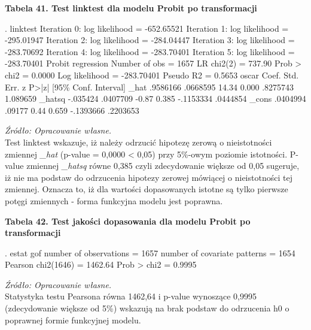 \vspace{0.5cm}
\textbf{Tabela 41. Test linktest dla modelu Probit po transformacji}
\begin{stlog}
. linktest
{\smallskip}
Iteration 0:   log likelihood = -652.65521  
Iteration 1:   log likelihood = -295.01947  
Iteration 2:   log likelihood = -284.04447  
Iteration 3:   log likelihood = -283.70692  
Iteration 4:   log likelihood = -283.70401  
Iteration 5:   log likelihood = -283.70401  
{\smallskip}
Probit regression                                 Number of obs   =       1657
                                                  LR chi2(2)      =     737.90
                                                  Prob > chi2     =     0.0000
Log likelihood = -283.70401                       Pseudo R2       =     0.5653
{\smallskip}
       oscar {\VBAR}      Coef.   Std. Err.      z    P>|z|     [95\% Conf. Interval]
        _hat {\VBAR}   .9586166   .0668595    14.34   0.000     .8275743    1.089659
      _hatsq {\VBAR}   -.035424   .0407709    -0.87   0.385    -.1153334    .0444854
       _cons {\VBAR}   .0404994     .09177     0.44   0.659    -.1393666    .2203653
\end{stlog}
\textit{\footnotesize{Źródło: Opracowanie własne.}} \\

Test linktest wskazuje, iż należy odrzucić hipotezę zerową o nieistotności zmiennej \textit{_hat} (p-value = 0,0000 < 0,05) przy 5\%-owym poziomie istotności.
P-value zmiennej \textit{_hatsq} równe 0,385 czyli zdecydowanie większe od 0,05 sugeruje, iż nie ma podstaw do odrzucenia hipotezy zerowej mówiącej o nieistotności tej zmiennej. Oznacza to, iż dla wartości dopasowanych istotne są tylko pierwsze potęgi zmiennych - forma funkcyjna modelu jest poprawna.

\vspace{0.5cm}
\textbf{Tabela 42. Test jakości dopasowania dla modelu Probit po transformacji}
\begin{stlog}
. estat gof
{\smallskip}
{}
{\smallskip}
       number of observations =      1657
 number of covariate patterns =      1654
           Pearson chi2(1646) =      1462.64
                  Prob > chi2 =         0.9995
\end{stlog}
\textit{\footnotesize{Źródło: Opracowanie własne.}} \\

Statystyka testu Pearsona równa 1462,64 i p-value wynoszące 0,9995 (zdecydowanie większe od 5\%) wskazują na brak podstaw do odrzucenia h0 o poprawnej formie funkcyjnej modelu.

